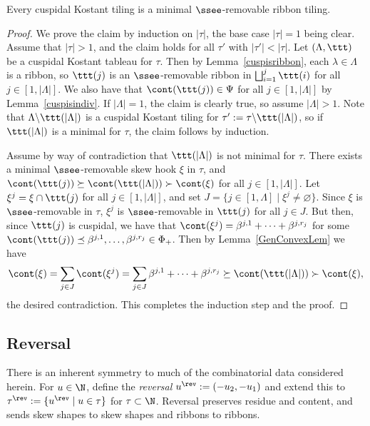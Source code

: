 \begin{lemma}\label{cuspisrib}
Every cuspidal Kostant tiling is a minimal \(\ssee\)-removable ribbon tiling.
\end{lemma}
\begin{proof}
We prove the claim by induction on \(|\tau|\), the base case \(|\tau|=1\) being clear. Assume that \(|\tau| >1\), and the claim holds for all \(\tau'\) with \(|\tau'| < |\tau|\). 
Let \((\Lambda, \ttt)\) be a cuspidal Kostant tableau for \(\tau\). Then by Lemma~\ref{cuspisribbon}, each \(\lambda \in \Lambda\) is a ribbon, so \(\ttt(j)\) is an \(\ssee\)-removable ribbon in \(\bigsqcup_{i=1}^j \ttt(i)\) for all \(j \in [1, |\Lambda|]\). We also have that \(\cont(\ttt(j)) \in \Psi\) for all \(j \in [1,|\Lambda|]\) by Lemma~\ref{cuspisindiv}.
If \(|\Lambda| = 1\), the claim is clearly true, so assume \(|\Lambda|>1\). Note that \(\Lambda \backslash \ttt(|\Lambda|)\) is a cuspidal Kostant tiling for \(\tau':= \tau \backslash \ttt(|\Lambda|)\), so if \(\ttt(|\Lambda|)\) is a minimal for \(\tau\), the claim follows by induction. 

Assume by way of contradiction that \(\ttt(|\Lambda|)\) is not minimal for \(\tau\). There exists a minimal \(\ssee\)-removable skew hook \(\xi\) in \(\tau\), and \(\cont(\ttt(j)) \succeq \cont(\ttt(|\Lambda|)) \succ \cont(\xi)\) for all \(j \in [1,|\Lambda|]\). Let \(\xi^j = \xi \cap \ttt(j)\) for all \(j \in [1,|\Lambda|]\), and set \(J = \{  j \in [1,\Lambda] \mid \xi^j \neq \varnothing\}\). Since \(\xi\) is \(\ssee\)-removable in \(\tau\), \(\xi^j\) is \(\ssee\)-removable in \(\ttt(j)\) for all \(j \in J\). But then, since \(\ttt(j)\) is cuspidal, we have that \(\cont(\xi^j) = \beta^{j,1} + \cdots + \beta^{j,r_j}\) for some \(\cont(\ttt(j)) \preceq \beta^{j,1}, \ldots, \beta^{j,r_j} \in \Phi_+\). Then by Lemma~\ref{GenConvexLem} we have
\begin{align*}
\cont(\xi) = \sum_{j \in J} \cont(\xi^j) =  \sum_{j \in J} \beta^{j,1} + \cdots + \beta^{j,r_j} \succeq \cont(\ttt(|\Lambda|)) \succ \cont(\xi),
\end{align*}
the desired contradiction. This completes the induction step and the proof.
\end{proof}


\subsection{Reversal}\label{revsec}
There is an inherent symmetry to much of the combinatorial data considered herein. For \(u \in \N\), define the {\em reversal} \(u^\rev:= (-u_2,-u_1)\) and extend this to \(\tau^\rev:= \{u^\rev \mid u \in \tau\}\) for \(\tau \subset \N\). Reversal preserves residue and content, and sends skew shapes to skew shapes and ribbons to ribbons.


